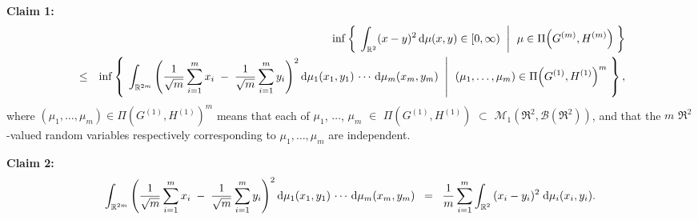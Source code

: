 \begin{center}
\begin{minipage}{6.5in}
\noindent
\vskip 0.5cm
\textbf{Claim 1:}
\begin{eqnarray*}
&&
	\inf\left\{\; \left. \int_{\mathbb{R}^{2}}(x - y)^{2}\,\textnormal{d}\mu(x,y) \in [0,\infty) \;\;\right\vert\;\, \mu \in \Pi\!\left(G^{(m)},H^{(m)}\right) \;\right\}
\\
&\leq&
	\inf\left\{\; \left.
	\int_{\mathbb{R}^{2m}}\left(\dfrac{1}{\sqrt{m}}\sum_{i=1}^{m}x_{i} \;-\; \dfrac{1}{\sqrt{m}}\sum_{i=1}^{m}y_{i}\right)^{2}
	\textnormal{d}\mu_{1}(x_{1},y_{1})\,\cdots\,\textnormal{d}\mu_{m}(x_{m},y_{m})
	\;\;\right\vert\;\,
	(\mu_{1},\ldots,\mu_{m}) \in \Pi\!\left(G^{(1)},H^{(1)}\right)^{m}
	\;\right\},
\end{eqnarray*}
where
$(\mu_{1},\ldots,\mu_{m}) \in \Pi\!\left(G^{(1)},H^{(1)}\right)^{m}$ means that
each of $\mu_{1}$, $\ldots$, $\mu_{m}$ $\in$ $\Pi\!\left(G^{(1)},H^{(1)}\right)$
$\subset$ $\mathcal{M}_{1}(\Re^{2},\mathcal{B}(\Re^{2}))$,
and that the $m$ $\Re^{2}$-valued random variables  respectively corresponding to
$\mu_{1}, \ldots, \mu_{m}$ are independent.

\vskip 0.8cm
\textbf{Claim 2:}
\begin{equation*}
	\int_{\mathbb{R}^{2m}}\left(\dfrac{1}{\sqrt{m}}\sum_{i=1}^{m}x_{i} \;-\; \dfrac{1}{\sqrt{m}}\sum_{i=1}^{m}y_{i}\right)^{2}
	\textnormal{d}\mu_{1}(x_{1},y_{1})\,\cdots\,\textnormal{d}\mu_{m}(x_{m},y_{m})
	\;\; = \;\;
	\dfrac{1}{m}\sum_{i=1}^{m}\int_{\mathbb{R}^{2}}\,(x_{i}-y_{i})^{2}\;\textnormal{d}\mu_{i}(x_{i},y_{i}).
\end{equation*}
\end{minipage}
\end{center}

